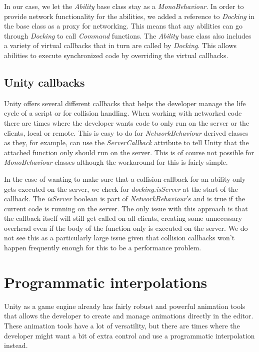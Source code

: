 In our case, we let the \emph{Ability} base class stay as a \emph{MonoBehaviour}. In order to provide network functionality for the abilities, we added a reference to \emph{Docking} in the base class as a proxy for networking. This means that any abilities can go through \emph{Docking} to call \emph{Command} functions. The \emph{Ability} base class also includes a variety of virtual callbacks that in turn are called by \emph{Docking}.  This allows abilities to execute synchronized code by overriding the virtual callbacks. 

\subsection{Unity callbacks}
Unity offers several different callbacks that helps the developer manage the life cycle of a script or for collision handling. When working with networked code there are times where the developer wants code to only run on the server or the clients, local or remote. This is easy to do for \emph{NetworkBehaviour} derived classes as they, for example, can use the \emph{ServerCallback} attribute to tell Unity that the attached function only should run on the server. This is of course not possible for \emph{MonoBehaviour} classes although the workaround for this is fairly simple. 

In the case of wanting to make sure that a collision callback for an ability only gets executed on the server, we check for \emph{docking.isServer} at the start of the callback. The \emph{isServer} boolean is part of \emph{NetworkBehaviour}'s and is true if the current code is running on the server. The only issue with this approach is that the callback itself will still get called on all clients, creating some unnecessary overhead even if the body of the function only is executed on the server. We do not see this as a particularly large issue given that collision callbacks won't happen frequently enough for this to be a performance problem.

\section{Programmatic interpolations}
\label{sec:boomerangCurve}
Unity as a game engine already has fairly robust and powerful animation tools that allows the developer to create and manage animations directly in the editor. These animation tools have a lot of versatility, but there are times where the developer might want a bit of extra control and use a programmatic interpolation instead. 

